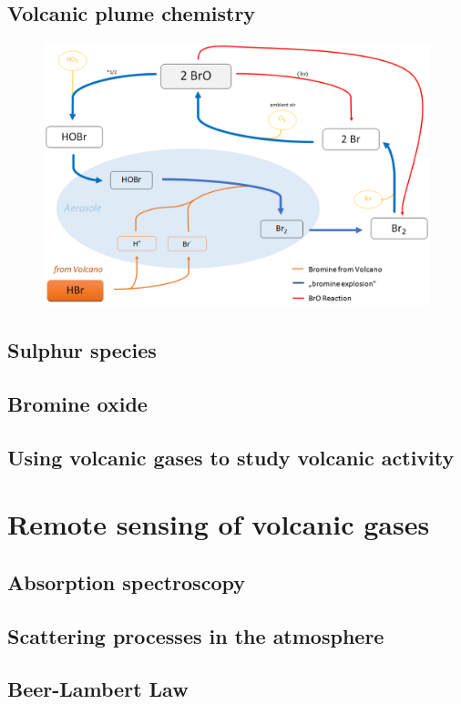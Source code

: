 \documentclass  [
  paper    = a4,
  BCOR     = 10mm,
  twoside,
  fontsize = 12pt,
  fleqn,
  toc      = bibnumbered,
  toc      = listofnumbered,
  numbers  = noendperiod,
  headings = normal,
  listof   = leveldown,
  version  = 3.03
]                                       {scrreprt}
\begin{document}
	\subsection{Volcanic plume chemistry}
	\begin{figure}
		\centering
		\includegraphics[width=0.7\linewidth]{Bilder/Simon/Bilder_Tung/BrO_Explosion}
		\caption{}
		\label{fig:broexplosion}
	\end{figure}
	
	\subsection{Sulphur species}
	\subsection{Bromine oxide}
	\subsection{Using volcanic gases to study volcanic activity}
	\section{Remote sensing of volcanic gases}
	\subsection{Absorption spectroscopy}
	\subsection{Scattering processes in the atmosphere}
	\subsection{Beer-Lambert Law}
\end{document}

